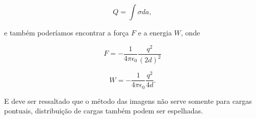 \begin{equation}
    Q = \int \sigma da,
\end{equation}

e também poderíamos encontrar a força $F$ e a energia $W$, onde

\begin{equation}
    F = -\frac{1}{4\pi \epsilon_{0}} \frac{q^2}{(2d)^2}
\end{equation}

\begin{equation}
    W = -\frac{1}{4\pi \epsilon_{0}} \frac{q^2}{4d}. 
\end{equation}

E deve ser ressaltado que o método das imagens não serve somente para cargas pontuais, distribuição de cargas também podem ser espelhadas. 
